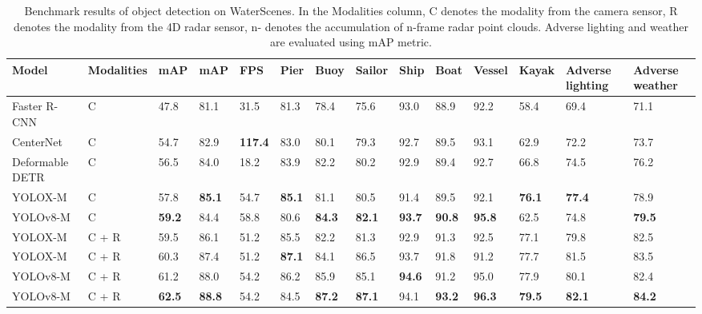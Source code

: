 \documentclass[lettersize,journal]{IEEEtran}
\begin{document}
\begin{table*}[!h]
\caption{Benchmark results of object detection on WaterScenes. In the Modalities column, C denotes the modality from the camera sensor, R denotes the modality from the 4D radar sensor, n- denotes the accumulation of n-frame radar point clouds. Adverse lighting and weather are evaluated using mAP metric.}
\center
\footnotesize
\begin{tabular*}{\linewidth}{
p{2.7cm}<{}
p{1.6cm}<{\centering}|
p{0.6cm}<{\centering}
p{0.6cm}<{\centering}
p{0.6cm}<{\centering}|
p{0.55cm}<{\centering}
p{0.6cm}<{\centering}
p{0.6cm}<{\centering}
p{0.6cm}<{\centering}
p{0.6cm}<{\centering}
p{0.6cm}<{\centering}
p{0.65cm}<{\centering}|
p{1cm}<{\centering}
p{0.9cm}<{\centering}}
\toprule
\bf{Model} & \bf{Modalities} & \bf{mAP } & \bf{mAP } & \bf{FPS} &  \textbf{Pier} & \textbf{Buoy} & \textbf{Sailor} & \textbf{Ship} & \textbf{Boat} & \textbf{Vessel} & \textbf{Kayak} & \bf{Adverse lighting} & \bf{Adverse weather}\\\midrule
Faster R-CNN \cite{girshick2015fast} & C & 47.8 & 81.1 & 31.5 & 81.3 & 78.4 & 75.6 & 93.0 & 88.9 & 92.2 & 58.4 & 69.4 & 71.1\\
CenterNet \cite{zhou2019objects} & C & 54.7 & 82.9 & \textbf{117.4} & 83.0 & 80.1 & 79.3 & 92.7 & 89.5 & 93.1 & 62.9 & 72.2 & 73.7\\
Deformable DETR \cite{zhu2020deformable}  & C & 56.5 & 84.0 & 18.2 & 83.9 & 82.2 & 80.2 & 92.9 & 89.4 & 92.7 & 66.8 & 74.5 & 76.2\\
YOLOX-M \cite{ge2021yolox} & C & 57.8 & \textbf{85.1} & 54.7 & \bf{85.1} & 81.1 & 80.5 & 91.4 & 89.5 & 92.1 & \bf{76.1} & \bf{77.4} & 78.9\\
YOLOv8-M \cite{yolov8} & C & \textbf{59.2} & 84.4 & 58.8 & 80.6 & \bf{84.3} & \bf{82.1} & \bf{93.7} & \bf{90.8} & \textbf{95.8} & 62.5 & 74.8 & \bf{79.5}\\
\midrule
YOLOX-M \cite{ge2021yolox} & C + R & 59.5 & 86.1 & 51.2 & 85.5 & 82.2 & 81.3 & 92.9 & 91.3 & 92.5 & 77.1 & 79.8 & 82.5\\
YOLOX-M \cite{ge2021yolox} & C + R & 60.3 & 87.4 & 51.2 & \textbf{87.1} & 84.1 & 86.5 & 93.7 & 91.8 & 91.2 & 77.7 & 81.5 & 83.5\\
YOLOv8-M \cite{yolov8} & C + R & 61.2 & 88.0 & 54.2 & 86.2 & 85.9 & 85.1 & \textbf{94.6} & 91.2 & 95.0 & 77.9 & 80.1 & 82.4\\
YOLOv8-M \cite{yolov8} & C + R & \textbf{62.5} & \textbf{88.8} & 54.2 & 84.5 & \textbf{87.2} & \textbf{87.1} & 94.1 & \textbf{93.2} & \bf{96.3} & \textbf{79.5} & \bf{82.1} & \bf{84.2}\\
\bottomrule
\end{tabular*}
\label{tab:object-detection-baselines}
\end{table*}
\end{document}
